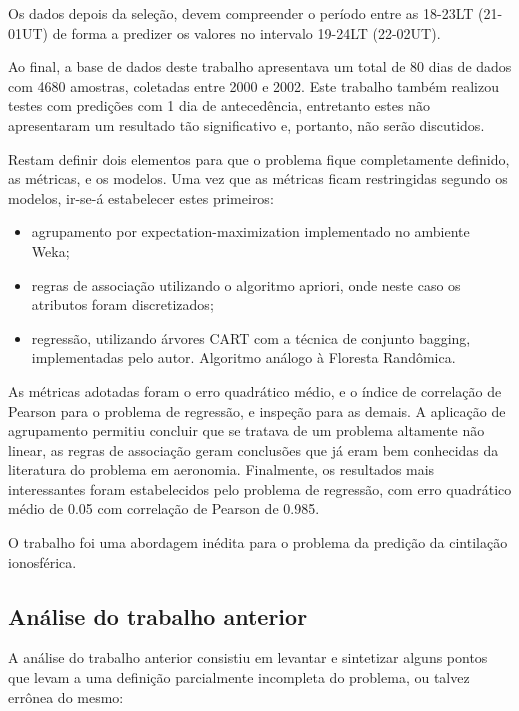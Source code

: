 Os dados depois da seleção, devem compreender o período  entre as 18-23LT (21-01UT) de forma a predizer os valores no intervalo 19-24LT (22-02UT).

Ao final, a base de dados deste trabalho apresentava um total de 80 dias de dados com 4680 amostras, coletadas entre 2000 e 2002. Este trabalho também realizou testes com predições com 1 dia de antecedência, entretanto estes não apresentaram um resultado tão significativo e, portanto, não serão discutidos.

Restam definir dois elementos para que o problema fique completamente definido, as métricas, e os modelos. Uma vez que as métricas ficam restringidas segundo os modelos, ir-se-á estabelecer estes primeiros:

\begin{itemize}
\item agrupamento por expectation-maximization implementado no ambiente Weka;
\item regras de associação utilizando o algoritmo apriori, onde neste caso os atributos foram discretizados;
\item regressão, utilizando árvores CART com a técnica de conjunto bagging, implementadas pelo autor. Algoritmo análogo à Floresta Randômica.
\end{itemize}

As métricas adotadas foram o erro quadrático médio, e o índice de correlação de Pearson para o problema de regressão, e inspeção para as demais. A aplicação de agrupamento permitiu concluir que se tratava de um problema altamente não linear, as regras de associação geram conclusões que já eram bem conhecidas da literatura do problema em aeronomia. Finalmente, os resultados mais interessantes foram estabelecidos pelo problema de regressão, com erro quadrático médio de 0.05 com correlação de Pearson de 0.985.

O trabalho foi uma abordagem inédita para o problema da predição da cintilação ionosférica.

\subsection{Análise do trabalho anterior}

A análise do trabalho anterior \cite{REZENDE:2009, REZENDE:2010} consistiu em levantar e sintetizar alguns pontos que levam a uma definição parcialmente incompleta do problema, ou talvez errônea do mesmo:

